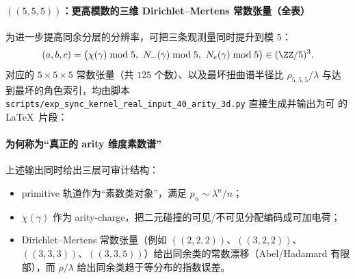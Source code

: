 \paragraph{\texorpdfstring{$((5,5,5))$}{(5,5,5)}：更高模数的三维 Dirichlet--Mertens 常数张量（全表）}
为进一步提高同余分层的分辨率，可把三条观测量同时提升到模 $5$：
$$
(a,b,c)=\bigl(\chi(\gamma)\bmod 5,\ N_-(\gamma)\bmod 5,\ N_e(\gamma)\bmod 5\bigr)\in(\ZZ/5)^3.
$$
对应的 $5\times 5\times 5$ 常数张量（共 $125$ 个数）、以及最坏扭曲谱半径比 $\rho_{5,5,5}/\lambda$ 与达到最坏的角色索引，均由脚本
\texttt{scripts/exp\_sync\_kernel\_real\_input\_40\_arity\_3d.py}
直接生成并输出为可 \verb|| 的 \LaTeX\ 片段：


\paragraph{为何称为“真正的 arity 维度素数谱”}
上述输出同时给出三层可审计结构：
\begin{itemize}
  \item primitive 轨道作为“素数类对象”，满足 $p_n\sim \lambda^n/n$；
\item $\chi(\gamma)$ 作为 arity-charge，把二元碰撞的可见/不可见分配编码成可加电荷；
  \item Dirichlet--Mertens 常数张量（例如 \(((2,2,2))\)、\(((3,2,2))\)、\(((3,3,3))\)、\(((3,3,5))\)）给出同余类的常数漂移（Abel/Hadamard 有限部），而 $\rho/\lambda$ 给出同余类趋于等分布的指数误差。
\end{itemize}
